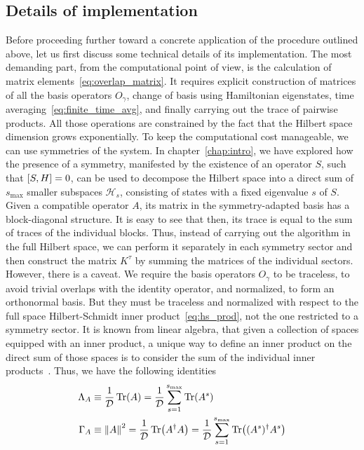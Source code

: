 \subsection{Details of implementation}
Before proceeding further toward a concrete application of the procedure outlined above, let us first discuss
 some technical details of its implementation. The most demanding part, from the computational point of view,
 is the calculation of matrix elements~\eqref{eq:overlap_matrix}. It requires explicit construction of
 matrices of all the basis operators \(O_{\gamma}\), change of basis using Hamiltonian eigenstates,
 time averaging~\eqref{eq:finite_time_avg}, and finally carrying out the trace of pairwise products.
 All those operations are constrained by the fact that the Hilbert space dimension grows exponentially.
 To keep the computational cost manageable, we can use symmetries of the system. In chapter~\ref{chap:intro}, we
 have explored how the presence of a symmetry, manifested by the existence of an operator \(S\), such
 that \(\comm{S}{H} = 0\), can be used to decompose the Hilbert space into a direct sum of \(s_{\text{max}}\) smaller
  subspaces \(\mathcal{H}_{s}\), consisting of states with a fixed eigenvalue \(s\) of \(S\). Given a
  compatible operator \(A\), its matrix in the symmetry-adapted basis has a block-diagonal structure.
  It is easy to see that then, its trace is equal to the sum of traces of the individual blocks.
  Thus, instead of carrying out the algorithm in the full Hilbert space, we can perform it separately
  in each symmetry sector and then construct the matrix \(K^{\tau}\) by summing the matrices of the
  individual sectors. However, there is a caveat. We require the basis operators \(O_{\gamma}\) to be
  traceless, to avoid trivial overlaps with the identity operator, and normalized, to form an orthonormal
  basis. But they must be traceless and normalized with respect to the full space Hilbert-Schmidt inner
  product~\eqref{eq:hs_prod}, not the one restricted to a symmetry sector. It is known from linear algebra,
  that given a collection of spaces equipped with an inner product, a unique way to define an inner product
  on the direct sum of those spaces is to consider the sum of the individual inner products~\autocite{Conway2007}.
  Thus, we have the following identities
  \begin{align}
    \Lambda_A &\equiv \frac{1}{\mathcal{D}} \Tr(A) = \frac{1}{\mathcal{D}} \sum_{s=1}^{s_{\text{max}}} \Tr(A^s)\\
    \Gamma_A &\equiv \norm{A}^2 = \frac{1}{\mathcal{D}} \Tr(A^{\dag}A) = \frac{1}{\mathcal{D}} \sum_{s=1}^{s_{\text{max}}} \Tr((A^s)^{\dag}A^s)
  \end{align}
